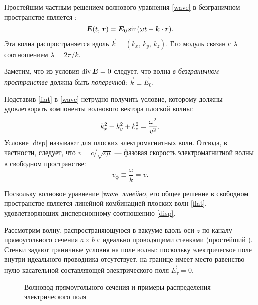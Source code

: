 Простейшим частным решением волнового уравнения \eqref{wave} в безграничном пространстве 
является :
\begin{equation} \eqmark{flat}
\vec{E}(t,\,\vec{r}) = \vec{E}_{0} \sin(\omega t - \vec{k}\cdot\vec{r}).
\end{equation}
Эта волна распространяется вдоль  $\vec{k}=(k_x,\,k_y,\,k_z)$.
Его модуль связан с  $\lambda$ соотношением $\lambda=2\pi/k$.

Заметим, что из условия $\mathop{\mathrm{div}} {\boldsymbol{E}}=0$ следует, что волна \emph{в безграничном
пространстве} должна быть \emph{поперечной}: $\vec{k} \perp \vec{E}_0$. 

Подставив \eqref{flat} в
\eqref{wave} нетрудно получить условие, которому должны удовлетворять компоненты
волнового вектора плоской волны:
\begin{equation} \eqmark{disp}
k_x^2 + k_y^2 + k_z^2 = \frac{\omega^2}{v^2}.
\end{equation}
Условие \eqref{disp} называют  для
плоских электромагнитных волн. Отсюда, в частности, следует, что
$v=c/\sqrt{\varepsilon\mu}$ --- фазовая скорость электромагнитной 
волны в свободном пространстве:
\[
v_{ф} \equiv \frac{\omega}{k} = v.
\]

Поскольку волновое уравнение \eqref{wave} \emph{линейно}, его общее решение 
в свободном пространстве является линейной комбинацией плоских
волн \eqref{flat}, удовлетворяющих дисперсионному соотношению \eqref{disp}.


Рассмотрим волну, распространяющуюся в вакууме вдоль оси $z$ по каналу 
прямоугольного сечения $a\times b$ с идеально проводящими стенками 
(простейший ).
Стенки задают граничные условия на поле волны:
поскольку электрическое поле внутри идеального проводника отсутствует,
на границе имеет место равенство нулю касательной составляющей
электрического поля $\vec{E}_{\tau} = 0$. 

\begin{figure}[h!]
    \centering
    \caption{Волновод прямоугольного сечения и примеры распределения электрического поля} 
\end{figure}


